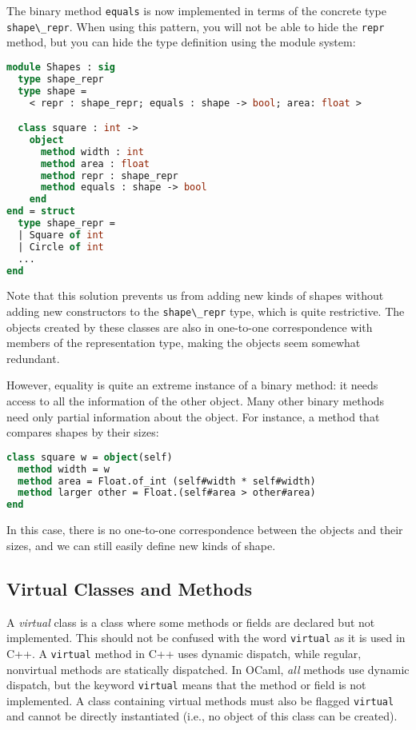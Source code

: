 The binary method \passthrough{\lstinline!equals!} is now implemented in
terms of the concrete type \passthrough{\lstinline!shape\_repr!}. When
using this pattern, you will not be able to hide the
\passthrough{\lstinline!repr!} method, but you can hide the type
definition using the module system:

\begin{lstlisting}[language=Caml]
module Shapes : sig
  type shape_repr
  type shape =
    < repr : shape_repr; equals : shape -> bool; area: float >

  class square : int ->
    object
      method width : int
      method area : float
      method repr : shape_repr
      method equals : shape -> bool
    end
end = struct
  type shape_repr =
  | Square of int
  | Circle of int
  ...
end
\end{lstlisting}

Note that this solution prevents us from adding new kinds of shapes
without adding new constructors to the
\passthrough{\lstinline!shape\_repr!} type, which is quite restrictive.
The objects created by these classes are also in one-to-one
correspondence with members of the representation type, making the
objects seem somewhat redundant.

However, equality is quite an extreme instance of a binary method: it
needs access to all the information of the other object. Many other
binary methods need only partial information about the object. For
instance, a method that compares shapes by their sizes:

\begin{lstlisting}[language=Caml]
class square w = object(self)
  method width = w
  method area = Float.of_int (self#width * self#width)
  method larger other = Float.(self#area > other#area)
end
\end{lstlisting}

In this case, there is no one-to-one correspondence between the objects
and their sizes, and we can still easily define new kinds of shape.

\hypertarget{virtual-classes-and-methods}{%
\subsection{Virtual Classes and
Methods}\label{virtual-classes-and-methods}}

A \emph{virtual} class is a class where some methods or fields are
declared but not implemented. This should not be confused with the word
\passthrough{\lstinline!virtual!} as it is used in C++. A
\passthrough{\lstinline!virtual!} method in C++ uses dynamic dispatch,
while regular, nonvirtual methods are statically dispatched. In OCaml,
\emph{all} methods use dynamic dispatch, but the keyword
\passthrough{\lstinline!virtual!} means that the method or field is not
implemented. A class containing virtual methods must also be flagged
\passthrough{\lstinline!virtual!} and cannot be directly instantiated
(i.e., no object of this class can be created).

